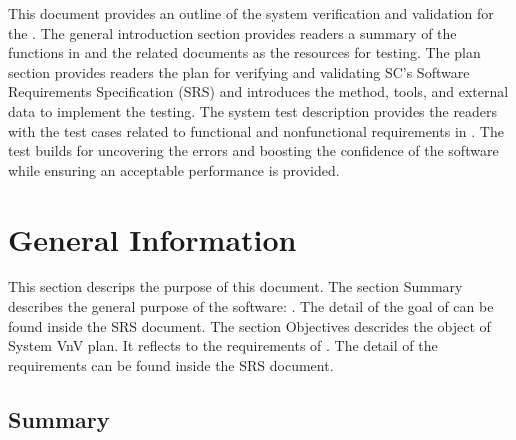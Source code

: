 \documentclass[12pt, titlepage]{article}
\begin{document}



\newpage


This document provides an outline of the system verification and validation for
the \progname. The general introduction section provides readers a summary of
the functions in \progname{} and the related documents as the resources for
testing. The plan section provides readers the plan for verifying and
validating SC's Software Requirements Specification (SRS) and introduces the
method, tools, and external data to implement the testing. The system test
description
provides the readers with the test cases related to functional and nonfunctional
requirements in \progname. The test builds for uncovering the errors and
boosting the confidence of the software while ensuring an acceptable
performance is provided. 



\section{General Information}

This section descrips the purpose of this document. The section Summary describes the general purpose of the software: \progname. The detail of the goal of \progname can be found inside the SRS document. The section Objectives descrides the object of  System VnV plan. It reflects to the requirements of \progname. The detail of the requirements can be found inside the SRS document. 

\subsection{Summary}
\end{document}
